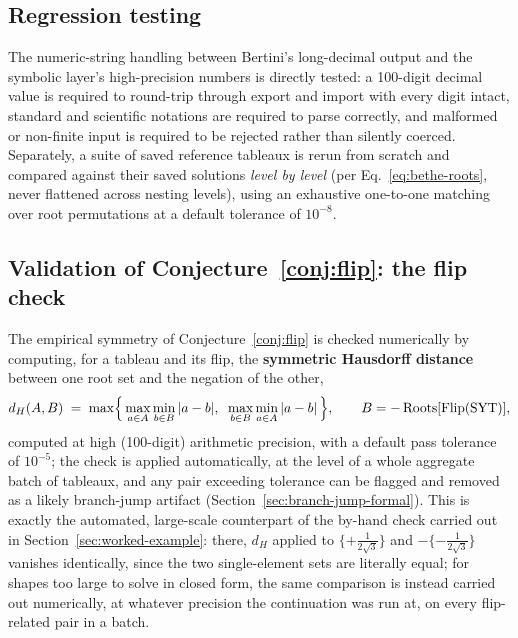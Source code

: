 \documentclass[11pt]{article}
\begin{document}
\subsection{Regression testing}

The numeric-string handling between Bertini's long-decimal output and the
symbolic layer's high-precision numbers is directly tested: a
100-digit decimal value is required to round-trip through export and
import with every digit intact, standard and scientific notations are
required to parse correctly, and malformed or non-finite input is
required to be rejected rather than silently coerced. Separately, a suite
of saved reference tableaux is rerun from scratch and compared against
their saved solutions \emph{level by level} (per Eq.~\eqref{eq:bethe-roots},
never flattened across nesting levels), using an exhaustive one-to-one
matching over root permutations at a default tolerance of $10^{-8}$.

\subsection{Validation of Conjecture~\ref{conj:flip}: the flip check}
\label{sec:validation-flip}

The empirical symmetry of Conjecture~\ref{conj:flip} is checked
numerically by computing, for a tableau and its flip, the
\textbf{symmetric Hausdorff distance} between one root set and the
negation of the other,
\begin{equation}
  \label{eq:hausdorff}
  d_H(A,B) \;=\; \max\Bigl\{\, \max_{a\in A}\min_{b\in B}|a-b| ,\;\; \max_{b\in B}\min_{a\in A}|a-b| \,\Bigr\},
  \qquad B=-\operatorname{Roots}[\mathrm{Flip}(\mathrm{SYT})],
\end{equation}
computed at high (100-digit) arithmetic precision, with a default pass
tolerance of $10^{-5}$; the check is applied automatically, at the level
of a whole aggregate batch of tableaux, and any pair exceeding tolerance
can be flagged and removed as a likely branch-jump artifact
(Section~\ref{sec:branch-jump-formal}). This is exactly the automated,
large-scale counterpart of the by-hand check carried out in
Section~\ref{sec:worked-example}: there, $d_H$ applied to
$\{+\tfrac{1}{2\sqrt3}\}$ and $-\{-\tfrac{1}{2\sqrt3}\}$ vanishes
identically, since the two single-element sets are literally equal;
for shapes too large to solve in closed form, the same comparison is
instead carried out numerically, at whatever precision the continuation
was run at, on every flip-related pair in a batch.
\end{document}
